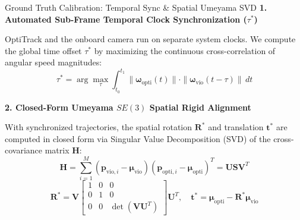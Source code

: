 \documentclass[aspectratio=169, 10pt]{beamer}
\begin{document}
\begin{frame}{Ground Truth Calibration: Temporal Sync \& Spatial Umeyama SVD}
  {\normalsize \textbf{\textcolor{NavyBlue}{1. Automated Sub-Frame Temporal Clock Synchronization ($\tau^*$)}}}
  \vspace{0.1cm}

  OptiTrack and the onboard camera run on separate system clocks. We compute the global time offset $\tau^*$ by maximizing the continuous cross-correlation of angular speed magnitudes:
  \begin{equation}
    \tau^* = \arg\max_\tau \int_{t_0}^{t_1} \|\boldsymbol{\omega}_{\text{opti}}(t)\| \cdot \|\boldsymbol{\omega}_{\text{vio}}(t - \tau)\| \, dt
  \end{equation}

  \vspace{0.25cm}
  {\normalsize \textbf{\textcolor{NavyBlue}{2. Closed-Form Umeyama $SE(3)$ Spatial Rigid Alignment}}}
  \vspace{0.1cm}

  With synchronized trajectories, the spatial rotation $\mathbf{R}^*$ and translation $\mathbf{t}^*$ are computed in closed form via Singular Value Decomposition (SVD) of the cross-covariance matrix $\mathbf{H}$:
  \begin{equation}
    \mathbf{H} = \sum_{i=1}^M (\mathbf{p}_{\text{vio},i} - \boldsymbol{\mu}_{\text{vio}}) (\mathbf{p}_{\text{opti},i} - \boldsymbol{\mu}_{\text{opti}})^T = \mathbf{U} \mathbf{S} \mathbf{V}^T
  \end{equation}
  \begin{equation}
    \mathbf{R}^* = \mathbf{V} \begin{bmatrix} 1 & 0 & 0 \\ 0 & 1 & 0 \\ 0 & 0 & \det(\mathbf{V} \mathbf{U}^T) \end{bmatrix} \mathbf{U}^T, \quad \mathbf{t}^* = \boldsymbol{\mu}_{\text{opti}} - \mathbf{R}^* \boldsymbol{\mu}_{\text{vio}}
  \end{equation}
\end{frame}
\end{document}
